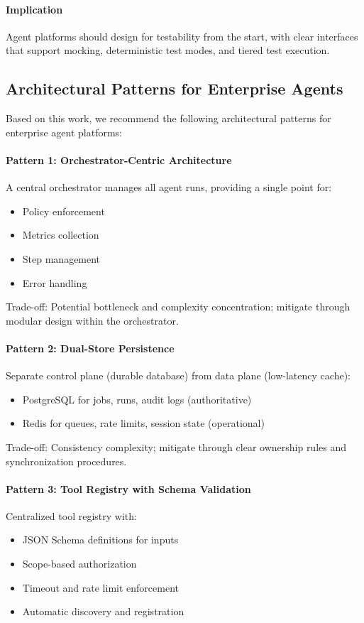 \paragraph{Implication}
Agent platforms should design for testability from the start, with clear interfaces that support mocking, deterministic test modes, and tiered test execution.

\subsection{Architectural Patterns for Enterprise Agents}

Based on this work, we recommend the following architectural patterns for enterprise agent platforms:

\paragraph{Pattern 1: Orchestrator-Centric Architecture}
A central orchestrator manages all agent runs, providing a single point for:
\begin{itemize}
    \item Policy enforcement
    \item Metrics collection
    \item Step management
    \item Error handling
\end{itemize}

Trade-off: Potential bottleneck and complexity concentration; mitigate through modular design within the orchestrator.

\paragraph{Pattern 2: Dual-Store Persistence}
Separate control plane (durable database) from data plane (low-latency cache):
\begin{itemize}
    \item PostgreSQL for jobs, runs, audit logs (authoritative)
    \item Redis for queues, rate limits, session state (operational)
\end{itemize}

Trade-off: Consistency complexity; mitigate through clear ownership rules and synchronization procedures.

\paragraph{Pattern 3: Tool Registry with Schema Validation}
Centralized tool registry with:
\begin{itemize}
    \item JSON Schema definitions for inputs
    \item Scope-based authorization
    \item Timeout and rate limit enforcement
    \item Automatic discovery and registration
\end{itemize}

